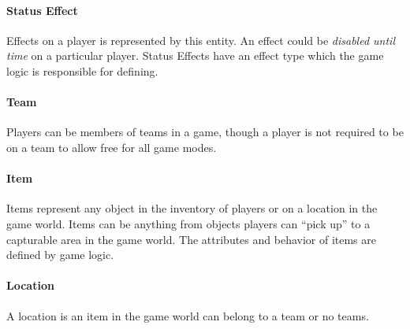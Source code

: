 \paragraph{Status Effect}
Effects on a player is represented by this entity. An effect could be \textit{disabled until time} on a particular player. Status Effects have an effect type which the game logic is responsible for defining.

\paragraph{Team}
Players can be members of teams in a game, though a player is not required to be on a team to allow free for all game modes.


\paragraph{Item}
Items represent any object in the inventory of players or on a location in the game world. Items can be anything from objects players can ``pick up'' to a capturable area in the game world. The attributes and behavior of items are defined by game logic.

\paragraph{Location}
A location is an item in the game world can belong to a team or no teams.





